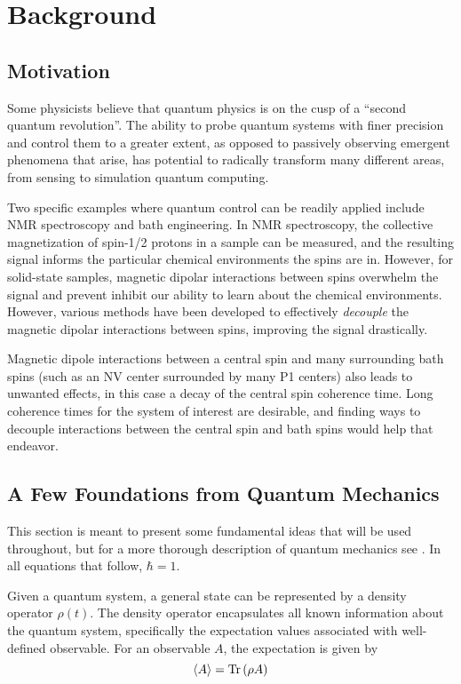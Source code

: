 \chapter{Background}

\section{Motivation}

Some physicists believe that quantum physics is on the cusp of a ``second quantum revolution''\cite{quantum-rev}. The ability to probe quantum systems with finer precision and control them to a greater extent, as opposed to passively observing emergent phenomena that arise, has potential to radically transform many different areas, from sensing to simulation quantum computing.

Two specific examples where quantum control can be readily applied include NMR spectroscopy and bath engineering. In NMR spectroscopy, the collective magnetization of spin-1/2 protons in a sample can be measured, and the resulting signal informs the particular chemical environments the spins are in. However, for solid-state samples, magnetic dipolar interactions between spins overwhelm the signal and prevent inhibit our ability to learn about the chemical environments. However, various methods have been developed to effectively \emph{decouple} the magnetic dipolar interactions between spins, improving the signal drastically.

Magnetic dipole interactions between a central spin and many surrounding bath spins (such as an NV center surrounded by many P1 centers) also leads to unwanted effects, in this case a decay of the central spin coherence time. Long coherence times for the system of interest are desirable, and finding ways to decouple interactions between the central spin and bath spins would help that endeavor.

\section{A Few Foundations from Quantum Mechanics}

This section is meant to present some fundamental ideas that will be used throughout, but for a more thorough description of quantum mechanics see
.
In all equations that follow, $\hbar = 1$.

Given a quantum system, a general state can be represented by a density operator $\rho(t)$. The density operator encapsulates all known information about the quantum system, specifically the expectation values associated with well-defined observable. For an observable $A$, the expectation is given by
\[
\langle A \rangle = \text{Tr}\left( \rho A \right)
\]

